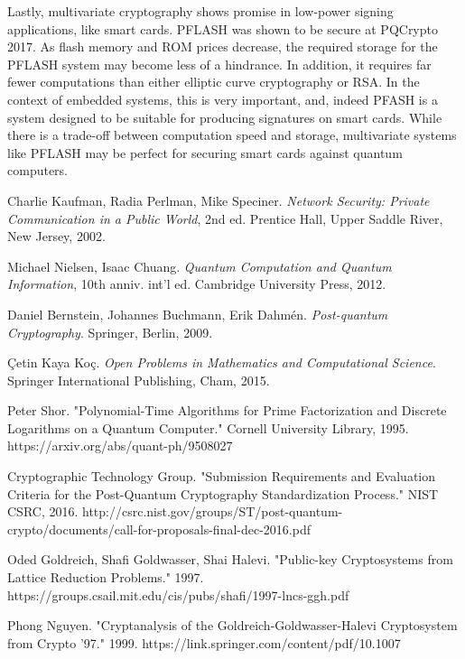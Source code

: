 \documentclass{article}
\begin{document}
Lastly, multivariate cryptography shows promise in low-power signing applications, like smart cards. PFLASH was shown to be secure at PQCrypto 2017. As flash memory and ROM prices decrease, the required storage for the PFLASH system may become less of a hindrance. In addition, it requires far fewer computations than either elliptic curve cryptography or RSA. In the context of embedded systems, this is very important,\cite{bernstein09} and, indeed PFASH is a system designed to be suitable for producing signatures on smart cards. While there is a trade-off between computation speed and storage, multivariate systems like PFLASH may be perfect for securing smart cards against quantum computers.

\begin{thebibliography}{99}

	Charlie Kaufman, Radia Perlman, Mike Speciner.
	\textit{Network Security: Private Communication in a Public World},
	2nd ed.
	Prentice Hall,
	Upper Saddle River, New Jersey,
	2002.
	
	Michael Nielsen, Isaac Chuang.
	\textit{Quantum Computation and Quantum Information},
	10th anniv. int'l ed.
	Cambridge University Press,
	2012.
	
	Daniel Bernstein, Johannes Buchmann, Erik Dahmén.
	\textit{Post-quantum Cryptography}.
	Springer,
	Berlin,
	2009.
	
	\c Cetin Kaya Ko\c c.
	\textit{Open Problems in Mathematics and Computational Science}.
	Springer International Publishing,
	Cham,
	2015.
	
	Peter Shor.
	"Polynomial-Time Algorithms for Prime Factorization and Discrete Logarithms on a Quantum Computer."
	Cornell University Library,
	1995.
	https://arxiv.org/abs/quant-ph/9508027
	
	Cryptographic Technology Group.
	"Submission Requirements and Evaluation Criteria for the Post-Quantum Cryptography Standardization Process."
	NIST CSRC,
	2016.
	http://csrc.nist.gov/groups/ST/post-quantum-crypto/documents/call-for-proposals-final-dec-2016.pdf
	
	Oded Goldreich, Shafi Goldwasser, Shai Halevi.
	"Public-key Cryptosystems from Lattice Reduction Problems."
	1997.
	https://groups.csail.mit.edu/cis/pubs/shafi/1997-lncs-ggh.pdf
	
	Phong Nguyen.
	"Cryptanalysis of the Goldreich-Goldwasser-Halevi Cryptosystem from Crypto ’97."
	1999.
	https://link.springer.com/content/pdf/10.1007%
	

\end{thebibliography}
\end{document}
